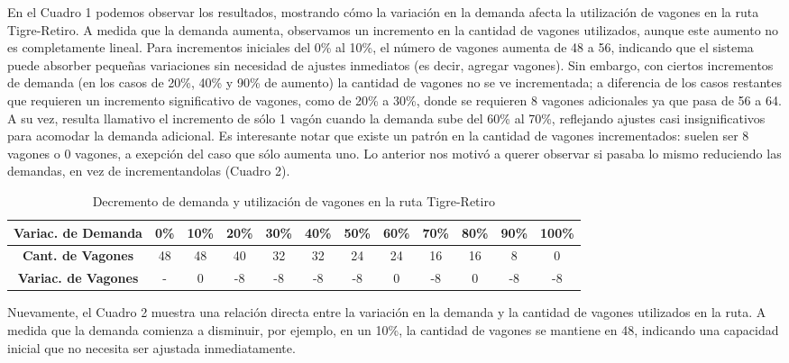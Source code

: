 \documentclass{article}
\begin{document}
    En el Cuadro 1 podemos observar los resultados, mostrando cómo la variación en la demanda afecta la utilización de vagones en la ruta Tigre-Retiro. A medida que la demanda aumenta, observamos un incremento en la cantidad de vagones utilizados, aunque este aumento no es completamente lineal. Para incrementos iniciales del 0\% al 10\%, el número de vagones aumenta de 48 a 56, indicando que el sistema puede absorber pequeñas variaciones sin necesidad de ajustes inmediatos (es decir, agregar vagones). Sin embargo, con ciertos incrementos de demanda (en los casos de 20\%, 40\% y 90\% de aumento) la cantidad de vagones no se ve incrementada; a diferencia de los casos restantes que requieren un incremento significativo de vagones, como de 20\% a 30\%, donde se requieren 8 vagones adicionales ya que pasa de 56 a 64. A su vez, resulta llamativo el incremento de sólo 1 vagón cuando la demanda sube del 60\% al 70\%, reflejando ajustes casi insignificativos para acomodar la demanda adicional. Es interesante notar que existe un patrón en la cantidad de vagones incrementados: suelen ser 8 vagones o 0 vagones, a exepción del caso que sólo aumenta uno. Lo anterior nos motivó a querer observar si pasaba lo mismo reduciendo las demandas, en vez de incrementandolas (Cuadro 2).
    \begin{table}[htbp]
            \centering
            \caption{Decremento de demanda y utilización de vagones en la ruta Tigre-Retiro}
            \begin{tabular}{|c||c|c|c|c|c|c|c|c|c|c|c|}
                \hline
                \textbf{Variac. de Demanda} & \textbf{0\%} & \textbf{10\%} & \textbf{20\%} & \textbf{30\%} & \textbf{40\%} & \textbf{50\%} & \textbf{60\%} & \textbf{70\%} & \textbf{80\%} & \textbf{90\%} & \textbf{100\%} \\
                \hline
                \textbf{Cant. de Vagones}   & 48           & 48    & 40       & 32           & 32           & 24           & 24           & 16           & 16           & 8           & 0                  \\
                \hline
                \textbf{Variac. de Vagones} & - & 0 & -8 & -8 & -8 & -8 & 0 & -8 & 0 & -8 & -8\\
                \hline
            \end{tabular}
        \end{table}
        Nuevamente, el Cuadro 2 muestra una relación directa entre la variación en la demanda y la cantidad de vagones utilizados en la ruta. A medida que la demanda comienza a disminuir, por ejemplo, en un 10\%, la cantidad de vagones se mantiene en 48, indicando una capacidad inicial que no necesita ser ajustada inmediatamente.
        
\end{document}

